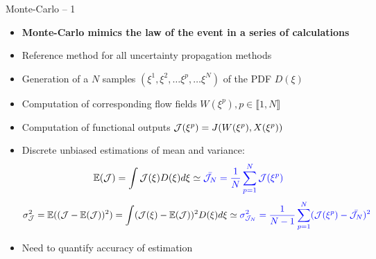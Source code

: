 \documentclass[10pt]{beamer}
\def\vf{\vspace{4mm}}
\def\begit{\begin{itemize}}
\def\endit{\end{itemize}}
\newcommand{\esp}{{\mathbb E}}
\begin{document}
\begin{frame}{ Monte-Carlo -- 1} 
%
\begit
\item[] {\bf Monte-Carlo mimics the law of the event  in a series of calculations}
%
\item[] Reference method for all uncertainty propagation methods
%
\vf
\item Generation of a $N$ samples $(\xi^1,\xi^2,\dots\xi^p,\dots\xi^N)$ of the PDF $D(\xi)$
\item Computation of corresponding flow fields $W(\xi^p), p \in \llbracket 1,N\rrbracket$
\item Computation of functional outputs  ${\cal J}(\xi^p)=J(W(\xi^p),X(\xi^p))$ 
\item Discrete unbiased estimations of mean and variance:
%
{\footnotesize
 $$ \esp({\cal J})= \int {\cal J}(\xi) D(\xi)d\xi \simeq {\color{blue}{\bar{{\cal J}_N} = \frac{1}{N}\sum_{p=1}^{N} {\cal J}(\xi^p)}}$$
%
 $$  \sigma^2_{\cal J} =
 \esp( ({\cal J}-\esp({\cal J}))^2)= \int ({\cal J}(\xi)-\esp({\cal J}))^2 D(\xi)d\xi \simeq  {\color{blue}{\sigma^2_{{\cal J}_N} = \frac{1}{N-1}\sum_{p=1}^{N} ({\cal J}(\xi^p)-\bar{{\cal J}_N})^2}}  $$}
%
\item Need to quantify accuracy of estimation
\endit
%
\end{frame} 
%
\end{document}
